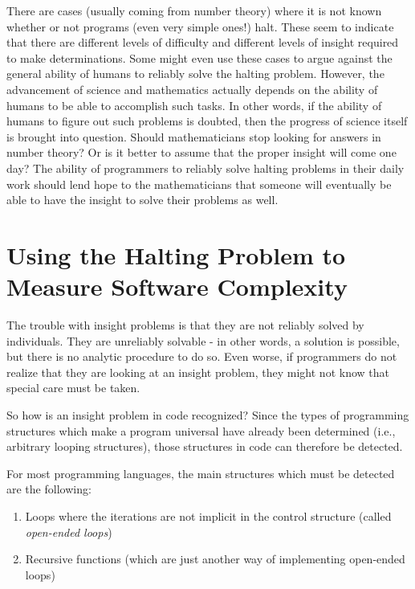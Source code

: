 There are cases (usually coming from number theory) where it is not known whether or not programs (even very simple ones!)  halt.  These seem to indicate that there are different levels of difficulty and different levels of insight required to make determinations.  Some might even use these cases to argue against the general ability of humans to reliably solve the halting problem.  However, the advancement of science and mathematics actually depends on the ability of humans to be able to accomplish such tasks.  In other words, if the ability of humans to figure out such problems is doubted, then the progress of science itself is brought into question.  Should mathematicians stop looking for answers in number theory?   Or is it better to assume that the proper insight will come one day?  The ability of programmers to reliably solve halting problems in their daily work should lend hope to the mathematicians that someone will eventually be able to have the insight to solve their problems as well.

\section{Using the Halting Problem to Measure Software Complexity}

The trouble with insight problems is that they are not reliably solved by individuals.  They are unreliably solvable - in other words, a solution is possible, but there is no analytic procedure to do so.  Even worse, if programmers do not realize that they are looking at an insight problem, they might not know that special care must be taken.

So how is an insight problem in code recognized?  Since the types of programming structures which make a program universal have already been determined (i.e., arbitrary looping structures), those structures in code can therefore be detected.

For most programming languages, the main structures which must be detected are the following:

\begin{enumerate}
\item Loops where the iterations are not implicit in the control structure (called \emph{open-ended loops})
\item Recursive functions (which are just another way of implementing open-ended loops)
\end{enumerate}

